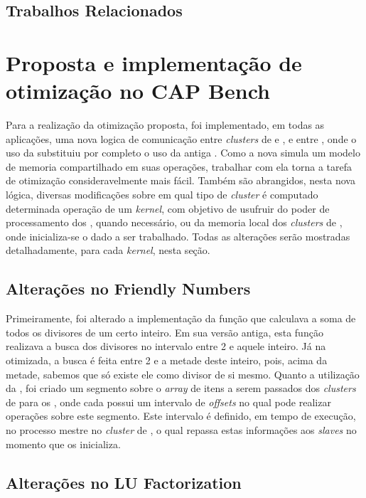 \documentclass[a4paper,11pt]{article}
\newcommand{\capb}{CAP Bench\xspace}
\begin{document}
\subsection{Trabalhos Relacionados}

\section{Proposta e implementação de otimização no \capb}
\label{sec:capbMPPA}

Para a realização da otimização proposta, foi implementado, em todas as aplicações, uma nova logica de comunicação entre \textit{clusters} de \io e \ccs, e entre \ccs, onde o uso da \async substituiu por completo o uso da antiga \ipc. Como a nova \api simula um modelo de memoria compartilhado em suas operações, trabalhar com ela torna a tarefa de otimização consideravelmente mais fácil. Também são abrangidos, nesta nova lógica, diversas modificações sobre em qual tipo de \textit{cluster} é computado determinada operação de um \textit{kernel}, com objetivo de usufruir do poder de processamento dos \ccs, quando necessário, ou da memoria local dos \textit{clusters} de \io, onde inicializa-se o dado a ser trabalhado. Todas as alterações serão mostradas detalhadamente, para cada \textit{kernel}, nesta seção.

\subsection{Alterações no Friendly Numbers}
\label{subsec:async}

Primeiramente, foi alterado a implementação da função que calculava a soma de todos os divisores de um certo inteiro. Em sua versão antiga, esta função realizava a busca dos divisores no intervalo entre 2 e aquele inteiro. Já na otimizada, a busca é feita entre 2 e a metade deste inteiro, pois, acima da metade, sabemos que só existe ele como divisor de si mesmo. Quanto a utilização da \async, foi criado um segmento sobre o \textit{array} de itens a serem passados dos \textit{clusters} de \io para os \ccs, onde cada \cc possui um intervalo de \textit{offsets} no qual pode realizar operações sobre este segmento. Este intervalo é definido, em tempo de execução, no processo mestre no \textit{cluster} de \io, o qual repassa estas informações aos \textit{slaves} no momento que os inicializa.

\subsection{Alterações no LU Factorization}
\label{subsec:async}
\end{document}
